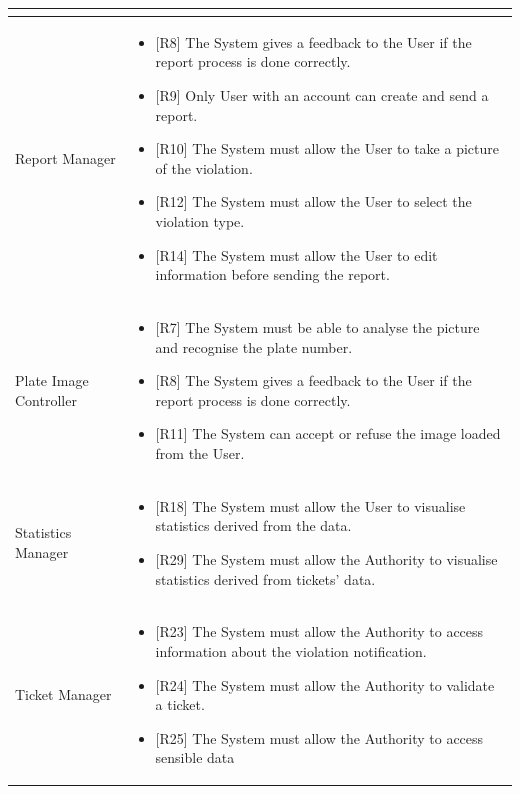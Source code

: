 \documentclass{article}
\begin{document}
\begin{longtable}{| p{5 cm} | p{8 cm} |}
\begin{itemize}
		\end{itemize}		\\	 \hline	
		\newline Report Manager  & 
		\begin{itemize}
			\item  {[R8] The System gives a feedback to the User if the report process is done correctly.}
			\item  {[R9] Only User with an account can create and send a report.}
			\item  {[R10] The System must allow the User to take a picture of the violation.}
			\item  {[R12] The System must allow the User to select the violation type.}
			\item  {[R14] The System must allow the User to edit information before sending the report.}
		\end{itemize}		\\	 \hline	
		\newline Plate Image Controller & 
		\begin{itemize}
			\item  {[R7] The System must be able to analyse the picture and recognise
the plate number.
}
			\item  {[R8] The System gives a feedback to the User if the report process is done correctly.} 
			\item  {[R11] The System can accept or refuse the image loaded from the User.}
		\end{itemize}		\\	 \hline	
		\newline Statistics Manager & 
		\begin{itemize}
			\item  {[R18] The System must allow the User to visualise statistics derived from the data.}
			\item  {[R29] The System must allow the Authority to visualise statistics derived from tickets’ data.}
		\end{itemize}		\\	 \hline		
			\newline Ticket Manager & 
		\begin{itemize}
			\item  {[R23] The System must allow the Authority to access information
about the violation notification.}
			\item  {[R24] The System must allow the Authority to validate a ticket.}
			\item  {[R25] The System must allow the Authority to access sensible data
}
\end{itemize}
\end{longtable}
\end{document}
